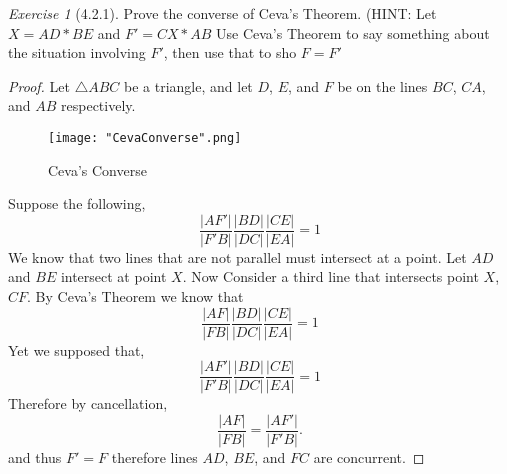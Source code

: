 \documentclass[12pt]{amsart}
\theoremstyle{remark}
\newtheorem*{exercise}{Exercise}%
\theoremstyle{mycomment}
\def\msquare{\mathord{\scalerel*{\Box}{gX}}}
\begin{document}
\thispagestyle{fancy}

\begin{exercise}[\msquare 4.2.1] Prove the converse of Ceva's Theorem. (HINT: Let $X=AD*BE$ and $F'= CX*AB$ Use Ceva's Theorem to say something about the situation involving $F'$, then use that to sho $F = F'$
\begin{proof} Let $\triangle ABC$ be a triangle, and let $D$, $E$, and $F$ be on the lines $BC$, $CA$, and $AB$ respectively. 
\begin{figure}[H]
\caption{Ceva's Converse}
\centering
\texttt{[image: "CevaConverse".png]}
\end{figure}
Suppose the following,
\begin{equation*}
\frac{|AF'|}{|F'B|} \frac{|BD|}{|DC|} \frac{|CE|}{|EA|} = 1
\end{equation*}
We know that two lines that are not parallel must intersect at a point. Let $AD$ and $BE$ intersect at point $X$. Now Consider a third line that intersects point $X$, $CF$. By Ceva's Theorem we know that 
\begin{equation*}
\frac{|AF|}{|FB|} \frac{|BD|}{|DC|} \frac{|CE|}{|EA|} = 1
\end{equation*}
Yet we supposed that,
\begin{equation*}
\frac{|AF'|}{|F'B|} \frac{|BD|}{|DC|} \frac{|CE|}{|EA|} = 1
\end{equation*}
Therefore by cancellation, 
\begin{equation*}
\frac{|AF|}{|FB|} = \frac{|AF'|}{|F'B|} .
\end{equation*}
and thus $F' = F$ therefore lines $AD$, $BE$, and $FC$ are concurrent.


\end{proof}
\end{exercise}
\end{document}
